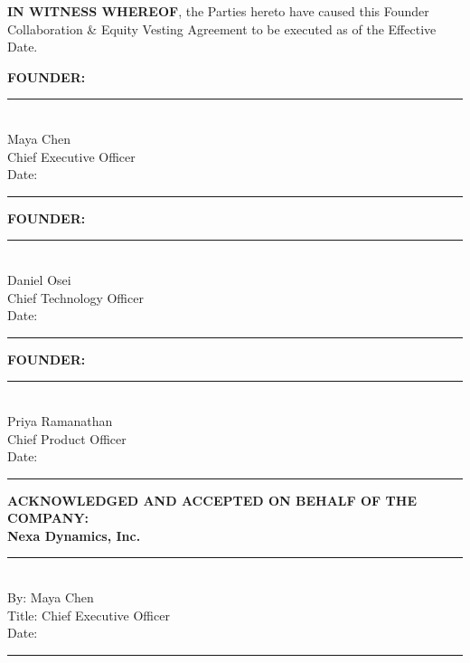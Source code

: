 \vspace{0.8em}

\textbf{IN WITNESS WHEREOF}, the Parties hereto have caused this Founder Collaboration \& Equity Vesting Agreement to be executed as of the Effective Date.

\vspace{1.2em}

\begin{minipage}[t]{0.30\textwidth}
  \textbf{FOUNDER:} \\

  \vspace{1.8em}
  \rule{2.0in}{0.5pt} \\
  Maya Chen \\
  Chief Executive Officer \\
  Date: \rule{1.2in}{0.5pt}
\end{minipage}
\hfill
\begin{minipage}[t]{0.30\textwidth}
  \textbf{FOUNDER:} \\

  \vspace{1.8em}
  \rule{2.0in}{0.5pt} \\
  Daniel Osei \\
  Chief Technology Officer \\
  Date: \rule{1.2in}{0.5pt}
\end{minipage}
\hfill
\begin{minipage}[t]{0.30\textwidth}
  \textbf{FOUNDER:} \\

  \vspace{1.8em}
  \rule{2.0in}{0.5pt} \\
  Priya Ramanathan \\
  Chief Product Officer \\
  Date: \rule{1.2in}{0.5pt}
\end{minipage}
\par

\vspace{1.5em}

\begin{minipage}[t]{0.45\textwidth}
  \textbf{ACKNOWLEDGED AND ACCEPTED ON BEHALF OF THE COMPANY:} \\
  \textbf{Nexa Dynamics, Inc.} \\

  \vspace{1.8em}
  \rule{2.2in}{0.5pt} \\
  By: Maya Chen \\
  Title: Chief Executive Officer \\
  Date: \rule{1.5in}{0.5pt}
\end{minipage}
\par

